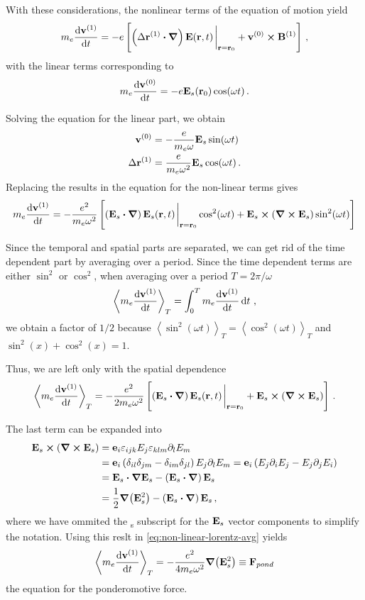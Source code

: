 \documentclass[12pt, class=report, crop=false]{standalone}
\begin{document}
With these considerations, the nonlinear terms of the equation of motion yield
\[
m_e \dv{\vb{v}^{(1)}}{t} = -e \left[
\left(\Delta \vb{r}^{(1)}\vdot\vb*{\nabla}\right)\vb{E}(\vb{r},t)\eval_{\vb{r}=\vb{r}_0} +
\vb{v}^{(0)} \cp \vb{B}^{(1)}
\right]\,,
\]
with the linear terms corresponding to
\[
m_e \dv{\vb{v}^{(0)}}{t} = -e \vb{E}_s(\vb{r}_0)\cos(\omega t)\,.
\]

Solving the equation for the linear part, we obtain
\[
\begin{aligned}
  \vb{v}^{(0)} &= -\frac{e}{m_e \omega} \vb{E}_s \sin(\omega t) \\
  \Delta\vb{r}^{(1)} &= \frac{e}{m_e \omega^2} \vb{E}_s \cos(\omega t)\,.
\end{aligned}
\]
Replacing the results in the equation for the non-linear terms gives
\[
  m_e \dv{\vb{v}^{(1)}}{t} = -\frac{e^2}{m_e\omega^2} \left[
  \left(\vb{E}_s\vdot\vb*{\nabla}\right)\vb{E}_s(\vb{r},t)\eval_{\vb{r}=\vb{r}_0}\cos^2(\omega t) +
  \vb{E}_s \cp (\curl{\vb{E}}_s)\sin^2(\omega t)
  \right]
\]

Since the temporal and spatial parts are separated, we can get rid of the time
dependent part by averaging over a period. Since the time dependent terms are either
\(\sin^2\) or \(\cos^2\), when averaging over a period \(T=2\pi/\omega\)
\[
\left\langle m_e \dv{\vb{v}^{(1)}}{t}\right\rangle_T = \int_0^T m_e \dv{\vb{v}^{(1)}}{t} \dd{t}\,,
\]
we obtain a factor of \(1/2\) because
\(\left\langle\sin^2(\omega t)\right\rangle_T = \left\langle\cos^2(\omega t)\right\rangle_T\) and
\(\sin^2(x) + \cos^2(x)=1\).

Thus, we are left only with the spatial dependence
\begin{equation}
  \label{eq:non-linear-lorentz-avg}
  \left\langle m_e \dv{\vb{v}^{(1)}}{t}\right\rangle_T =
  -\frac{e^2}{2m_e\omega^2} \left[
  \left(\vb{E}_s\vdot\vb*{\nabla}\right)\vb{E}_s(\vb{r},t)\eval_{\vb{r}=\vb{r}_0} +
  \vb{E}_s \cp (\curl{\vb{E}}_s)
  \right]\,.
\end{equation}

The last term can be expanded into
\[
\begin{aligned}
  \vb{E}_s \cp (\curl{\vb{E}}_s) &=
  \vb{e}_i \varepsilon_{ijk}E_j\varepsilon_{klm}\partial_l E_m \\ &=
  \vb{e}_i \left(\delta_{il}\delta_{jm}-\delta_{im}\delta_{jl}\right)E_j\partial_l E_m =
  \vb{e}_i \left(E_j \partial_i E_j - E_j \partial_j E_i\right) \\ &=
  \vb{E}_s\vdot\grad{\vb{E}_s} - \left(\vb{E}_s\vdot\vb*{\nabla}\right)\vb{E}_s \\ &=
  \frac{1}{2}\grad(\vb{E}_s^2) - \left(\vb{E}_s\vdot\vb*{\nabla}\right)\vb{E}_s\,,
\end{aligned}
\]
where we have ommited the \textsubscript{s} subscript for the \(\vb{E}_s\) vector
components to simplify the notation. Using this reslt in \cref{eq:non-linear-lorentz-avg}
yields
\begin{equation}
  \label{eq:ponderomotive-force}
  \left\langle m_e \dv{\vb{v}^{(1)}}{t}\right\rangle_T =
  -\frac{e^2}{4m_e\omega^2} \grad(\vb{E}_s^2) \equiv \vb{F}_{pond}
\end{equation}
the equation for the ponderomotive force.
\end{document}
